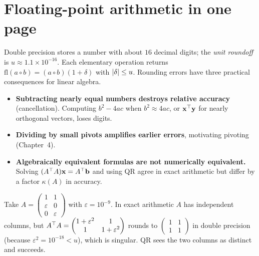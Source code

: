 \section{Floating-point arithmetic in one page}

Double precision stores a number with about $16$ decimal digits; the \emph{unit roundoff} is $u\approx1.1\times10^{-16}$. Each elementary operation returns $\mathrm{fl}(a\circ b)=(a\circ b)(1+\delta)$ with $\lvert\delta\rvert\le u$. Rounding errors have three practical consequences for linear algebra.

\begin{itemize}
  \item \textbf{Subtracting nearly equal numbers destroys relative accuracy} (cancellation). Computing $b^2-4ac$ when $b^2\approx4ac$, or $\mathbf{x}^{\top}\mathbf{y}$ for nearly orthogonal vectors, loses digits.
  \item \textbf{Dividing by small pivots amplifies earlier errors}, motivating pivoting (Chapter~4).
  \item \textbf{Algebraically equivalent formulas are not numerically equivalent.} Solving $(A^{\top} A)\mathbf{x}=A^{\top}\mathbf{b}$ and using QR agree in exact arithmetic but differ by a factor $\kappa(A)$ in accuracy.
\end{itemize}

\begin{example}
Take $A=\begin{pmatrix}1&1\\\varepsilon&0\\0&\varepsilon\end{pmatrix}$ with $\varepsilon=10^{-9}$. In exact arithmetic $A$ has independent columns, but $A^{\top} A=\begin{pmatrix}1+\varepsilon^2&1\\1&1+\varepsilon^2\end{pmatrix}$ rounds to $\begin{pmatrix}1&1\\1&1\end{pmatrix}$ in double precision (because $\varepsilon^2=10^{-18}<u$), which is singular. QR sees the two columns as distinct and succeeds.
\end{example}

